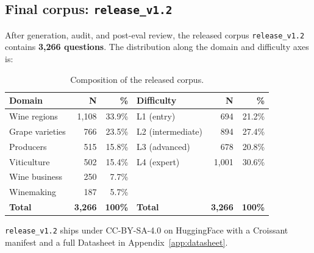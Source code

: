 \subsection{Final corpus: \texttt{release\_v1.2}}
\label{sec:release}
After generation, audit, and post-eval review, the released corpus
\texttt{release\_v1.2} contains \textbf{3{,}266 questions}. The
distribution along the domain and difficulty axes is:

\begin{table}[h]
  \centering
  \caption{Composition of the released corpus.}
  \label{tab:corpus}
  \small
  \begin{tabular}{lrrlrr}
    \toprule
    Domain & N & \% & Difficulty & N & \% \\
    \midrule
    Wine regions     & 1{,}108 & 33.9\% & L1 (entry)        & 694   & 21.2\% \\
    Grape varieties  & 766     & 23.5\% & L2 (intermediate) & 894   & 27.4\% \\
    Producers        & 515     & 15.8\% & L3 (advanced)     & 678   & 20.8\% \\
    Viticulture      & 502     & 15.4\% & L4 (expert)       & 1{,}001 & 30.6\% \\
    Wine business    & 250     &  7.7\% &                   &       &       \\
    Winemaking       & 187     &  5.7\% &                   &       &       \\
    \midrule
    \textbf{Total}   & \textbf{3{,}266} & \textbf{100\%}
                     & \textbf{Total}   & \textbf{3{,}266} & \textbf{100\%} \\
    \bottomrule
  \end{tabular}
\end{table}

\texttt{release\_v1.2} ships under CC-BY-SA-4.0 on HuggingFace with a
Croissant manifest \citep{koehn2024croissant} and a full Datasheet
\citep{gebru2021datasheets} in Appendix~\ref{app:datasheet}.

